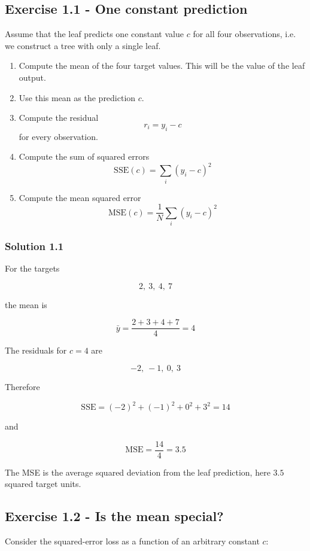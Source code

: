 \documentclass[10pt]{article}
\begin{document}
\subsection*{Exercise 1.1 - One constant prediction}
Assume that the leaf predicts one constant value $c$ for all four observations, i.e. we construct a tree with only a single leaf.

\begin{enumerate}
\item
Compute the mean of the four target values. This will be the value of the leaf output.

\item
Use this mean as the prediction $c$.

\item
Compute the residual
\[
r_i = y_i-c
\]
for every observation.

\item
Compute the sum of squared errors
\[
\mathrm{SSE}(c)=\sum_i (y_i-c)^2
\]

\item
Compute the mean squared error
\[
\mathrm{MSE}(c)=\frac{1}{N}\sum_i (y_i-c)^2
\]

\end{enumerate}
\begingroup\color{red}

\subsubsection*{Solution 1.1}
For the targets

\[
2,\ 3,\ 4,\ 7
\]

the mean is

\[
\bar y=\frac{2+3+4+7}{4}=4
\]

The residuals for $c=4$ are

\[
-2,\ -1,\ 0,\ 3
\]

Therefore

\[
\mathrm{SSE}=(-2)^2+(-1)^2+0^2+3^2=14
\]

and

\[
\mathrm{MSE}=\frac{14}{4}=3.5
\]

The MSE is the average squared deviation from the leaf prediction, here
$3.5$ squared target units.

\par\endgroup

\subsection*{Exercise 1.2 - Is the mean special?}
Consider the squared-error loss as a function of an arbitrary constant $c$:
\end{document}
